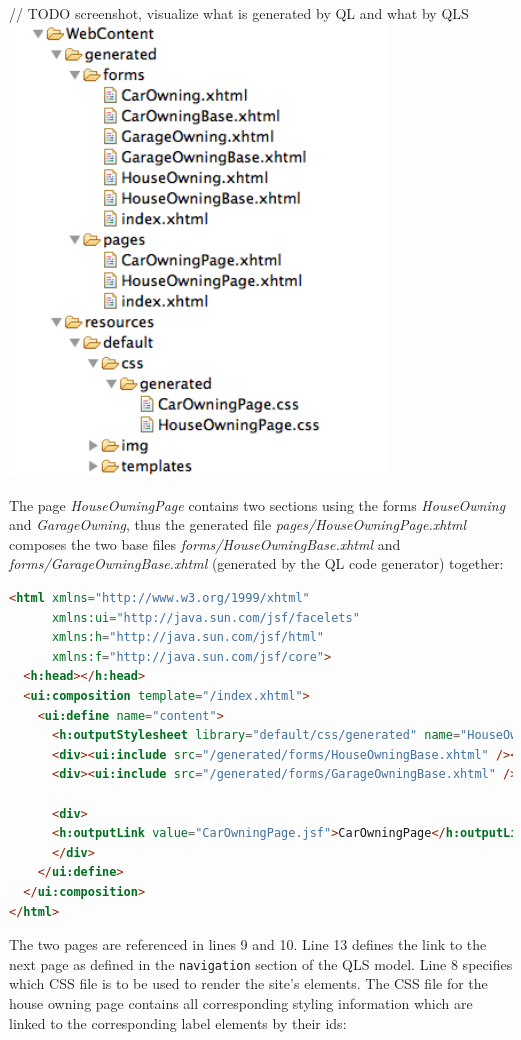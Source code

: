 // TODO screenshot, visualize what is generated by QL and what by QLS
\includegraphics[width=10cm]{./images/chapter03/referenceimpl_projecttree_qls.png}

The page \emph{HouseOwningPage} contains two sections using the forms \emph{HouseOwning} 
and \emph{GarageOwning}, thus the generated file \emph{pages/HouseOwningPage.xhtml} composes
the two base files \emph{forms/HouseOwningBase.xhtml} and \emph{forms/GarageOwningBase.xhtml}
(generated by the QL code generator) together:

\begin{lstlisting}[language=HTML]
<html xmlns="http://www.w3.org/1999/xhtml"
      xmlns:ui="http://java.sun.com/jsf/facelets"
      xmlns:h="http://java.sun.com/jsf/html"
      xmlns:f="http://java.sun.com/jsf/core">
  <h:head></h:head>
  <ui:composition template="/index.xhtml">
    <ui:define name="content">
      <h:outputStylesheet library="default/css/generated" name="HouseOwningPage.css"  />
      <div><ui:include src="/generated/forms/HouseOwningBase.xhtml" /></div><p/>
      <div><ui:include src="/generated/forms/GarageOwningBase.xhtml" /></div>
  
  	  <div>
  	  <h:outputLink value="CarOwningPage.jsf">CarOwningPage</h:outputLink>
	  </div>
    </ui:define>
  </ui:composition>
</html>
\end{lstlisting}

The two pages are referenced in lines 9 and 10. Line 13 defines the link to the
next page as defined in the \texttt{navigation} section of the QLS model. Line 8
specifies which CSS file is to be used to render the site's elements. The CSS
file for the house owning page contains all corresponding styling information 
which are linked to the corresponding label elements by their ids:

